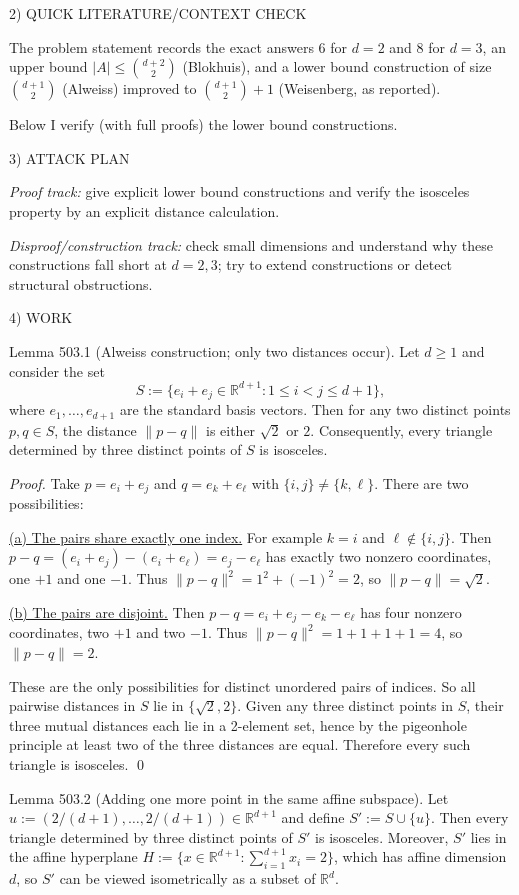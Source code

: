 2) QUICK LITERATURE/CONTEXT CHECK

The problem statement records the exact answers $6$ for $d=2$ and $8$ for $d=3$, an upper bound $\lvert A\rvert\le \binom{d+2}{2}$ (Blokhuis), and a lower bound construction of size $\binom{d+1}{2}$ (Alweiss) improved to $\binom{d+1}{2}+1$ (Weisenberg, as reported).

Below I verify (with full proofs) the lower bound constructions.

3) ATTACK PLAN

\emph{Proof track:} give explicit lower bound constructions and verify the isosceles property by an explicit distance calculation.

\emph{Disproof/construction track:} check small dimensions and understand why these constructions fall short at $d=2,3$; try to extend constructions or detect structural obstructions.

4) WORK

Lemma 503.1 (Alweiss construction; only two distances occur).
Let $d\ge 1$ and consider the set
\[
S:=\{e_i+e_j\in\mathbb R^{d+1}: 1\le i<j\le d+1\},
\]
where $e_1,\dots,e_{d+1}$ are the standard basis vectors.
Then for any two distinct points $p,q\in S$, the distance $\lVert p-q\rVert$ is either $\sqrt2$ or $2$.
Consequently, every triangle determined by three distinct points of $S$ is isosceles.

\emph{Proof.}
Take $p=e_i+e_j$ and $q=e_k+e_\ell$ with $\{i,j\}\ne\{k,\ell\}$.
There are two possibilities:

\underline{(a) The pairs share exactly one index.}
For example $k=i$ and $\ell\notin\{i,j\}$.
Then $p-q = (e_i+e_j)-(e_i+e_\ell)=e_j-e_\ell$ has exactly two nonzero coordinates, one $+1$ and one $-1$.
Thus $\lVert p-q\rVert^2=1^2+(-1)^2=2$, so $\lVert p-q\rVert=\sqrt2$.

\underline{(b) The pairs are disjoint.}
Then $p-q=e_i+e_j-e_k-e_\ell$ has four nonzero coordinates, two $+1$ and two $-1$.
Thus $\lVert p-q\rVert^2=1+1+1+1=4$, so $\lVert p-q\rVert=2$.

These are the only possibilities for distinct unordered pairs of indices.
So all pairwise distances in $S$ lie in $\{\sqrt2,2\}$.
Given any three distinct points in $S$, their three mutual distances each lie in a 2-element set, hence by the pigeonhole principle at least two of the three distances are equal. Therefore every such triangle is isosceles.
\qed

Lemma 503.2 (Adding one more point in the same affine subspace).
Let $u:=(2/(d+1),\dots,2/(d+1))\in\mathbb R^{d+1}$ and define $S' := S\cup\{u\}$.
Then every triangle determined by three distinct points of $S'$ is isosceles.
Moreover, $S'$ lies in the affine hyperplane $H:=\{x\in\mathbb R^{d+1}: \sum_{i=1}^{d+1} x_i=2\}$, which has affine dimension $d$, so $S'$ can be viewed isometrically as a subset of $\mathbb R^d$.

